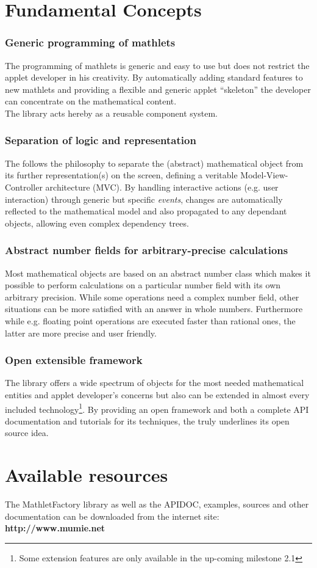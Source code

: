 \section{Fundamental Concepts}

\subsubsection*{Generic programming of mathlets}
The programming of mathlets is generic and easy to use but does not restrict the applet developer
in his creativity. By automatically adding standard features to new mathlets and providing a
flexible and generic applet ``skeleton'' the developer can concentrate on the mathematical content.\\
The \mf library acts hereby as a reusable component system.

\subsubsection*{Separation of logic and representation}
The \mf follows the philosophy to separate the (abstract) mathematical object from its further
representation(s) on the screen, defining a veritable Model-View-Controller architecture (MVC).
By handling interactive actions (e.g. user interaction) through generic but specific \textit{events}, 
changes are automatically reflected to the mathematical model and also propagated to any dependant 
objects, allowing even complex dependency trees.

\subsubsection*{Abstract number fields for arbitrary-precise calculations}
Most mathematical objects are based on an abstract number class which makes it possible to perform
calculations on a particular number field with its own arbitrary precision. While some operations
need a complex number field, other situations can be more satisfied with an answer in whole numbers.
Furthermore while e.g. floating point operations are executed faster than rational ones, the latter 
are more precise and user friendly.

\subsubsection*{Open extensible framework}
The \mf library offers a wide spectrum of objects for the most needed mathematical entities and 
applet developer's concerns but also can be extended in almost every included technology\footnote{
Some extension features are only available in the up-coming milestone 2.1}. By
providing an open framework and both a complete API documentation and tutorials for its techniques, 
the \mf truly underlines its open source idea.

\section{Available resources}
  The MathletFactory library as well as the APIDOC, examples, sources and other
  documentation can be downloaded from the internet site:\\
  \indent\indent\indent\indent\indent\indent \textbf{http://www.mumie.net}

